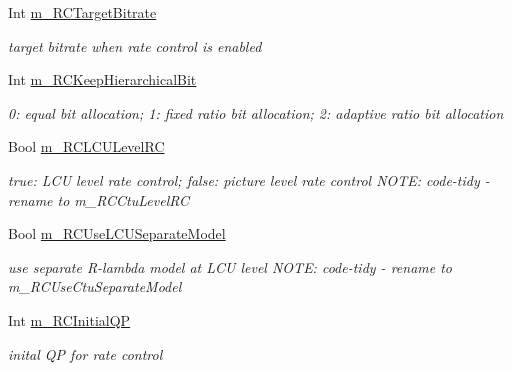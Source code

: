 \begin{DoxyCompactItemize}
\mbox{\label{class_t_app_enc_cfg_a96ae04d2b0516f93ad59417f29f96289}} 
Int \hyperlink{class_t_app_enc_cfg_a96ae04d2b0516f93ad59417f29f96289}{m\+\_\+\+R\+C\+Target\+Bitrate}
\begin{DoxyCompactList}\small\item\em target bitrate when rate control is enabled \end{DoxyCompactList}\item 
\mbox{\label{class_t_app_enc_cfg_a182ed70a7c76ac62dbb480998974dddd}} 
Int \hyperlink{class_t_app_enc_cfg_a182ed70a7c76ac62dbb480998974dddd}{m\+\_\+\+R\+C\+Keep\+Hierarchical\+Bit}
\begin{DoxyCompactList}\small\item\em 0\+: equal bit allocation; 1\+: fixed ratio bit allocation; 2\+: adaptive ratio bit allocation \end{DoxyCompactList}\item 
\mbox{\label{class_t_app_enc_cfg_a2d110f89bbff199e72684d8fd0c72ce6}} 
Bool \hyperlink{class_t_app_enc_cfg_a2d110f89bbff199e72684d8fd0c72ce6}{m\+\_\+\+R\+C\+L\+C\+U\+Level\+RC}
\begin{DoxyCompactList}\small\item\em true\+: L\+CU level rate control; false\+: picture level rate control N\+O\+TE\+: code-\/tidy -\/ rename to m\+\_\+\+R\+C\+Ctu\+Level\+RC \end{DoxyCompactList}\item 
\mbox{\label{class_t_app_enc_cfg_aa9f315435c21ad0cdbd30696d7c401cf}} 
Bool \hyperlink{class_t_app_enc_cfg_aa9f315435c21ad0cdbd30696d7c401cf}{m\+\_\+\+R\+C\+Use\+L\+C\+U\+Separate\+Model}
\begin{DoxyCompactList}\small\item\em use separate R-\/lambda model at L\+CU level N\+O\+TE\+: code-\/tidy -\/ rename to m\+\_\+\+R\+C\+Use\+Ctu\+Separate\+Model \end{DoxyCompactList}\item 
\mbox{\label{class_t_app_enc_cfg_a5da4a2af6351b59799dc2617eac8d99b}} 
Int \hyperlink{class_t_app_enc_cfg_a5da4a2af6351b59799dc2617eac8d99b}{m\+\_\+\+R\+C\+Initial\+QP}
\begin{DoxyCompactList}\small\item\em inital QP for rate control \end{DoxyCompactList}\item 

\end{DoxyCompactItemize}
